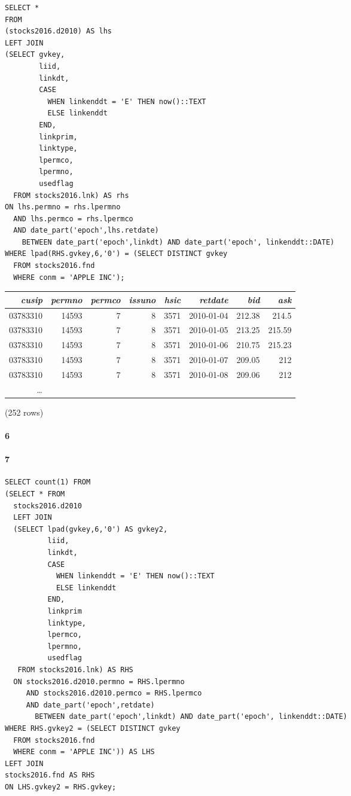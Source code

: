 \documentclass[]{article}
\let\oldparagraph\paragraph
\renewcommand{\paragraph}[1]{\oldparagraph{#1}\mbox{}}
\begin{document}
\color{blue}
\begin{verbatim}
SELECT *
FROM 
(stocks2016.d2010) AS lhs
LEFT JOIN
(SELECT gvkey,
        liid,
        linkdt,
        CASE
          WHEN linkenddt = 'E' THEN now()::TEXT
          ELSE linkenddt
        END,
        linkprim,
        linktype,
        lpermco,
        lpermno,
        usedflag
  FROM stocks2016.lnk) AS rhs
ON lhs.permno = rhs.lpermno
  AND lhs.permco = rhs.lpermco
  AND date_part('epoch',lhs.retdate) 
    BETWEEN date_part('epoch',linkdt) AND date_part('epoch', linkenddt::DATE)
WHERE lpad(RHS.gvkey,6,'0') = (SELECT DISTINCT gvkey
  FROM stocks2016.fnd
  WHERE conm = 'APPLE INC');
\end{verbatim}
\color{black}

\begin{center}
\begin{tabular}{r | r | r | r | r | r | r | r }
\textit{cusip} & \textit{permno} & \textit{permco} & \textit{issuno} & \textit{hsic} & \textit{retdate} & \textit{bid} & \textit{ask} \\
\hline
03783310 & 14593 & 7 & 8 & 3571 & 2010-01-04 & 212.38 & 214.5\\
03783310 & 14593 & 7 & 8 & 3571 & 2010-01-05 & 213.25 & 215.59\\
03783310 & 14593 & 7 & 8 & 3571 & 2010-01-06 & 210.75 & 215.23 \\
03783310 & 14593 & 7 & 8 & 3571 & 2010-01-07 & 209.05 & 212 \\
03783310 & 14593 & 7 & 8 & 3571 & 2010-01-08 & 209.06 & 212 \\
\ldots \\
\end{tabular}

\noindent (252 rows) \\
\end{center}

\paragraph{6}



\paragraph{7}

\color{blue}
\begin{verbatim}
SELECT count(1) FROM
(SELECT * FROM
  stocks2016.d2010
  LEFT JOIN
  (SELECT lpad(gvkey,6,'0') AS gvkey2,
          liid,
          linkdt,
          CASE
            WHEN linkenddt = 'E' THEN now()::TEXT
            ELSE linkenddt
          END,
          linkprim
          linktype,
          lpermco,
          lpermno,
          usedflag
   FROM stocks2016.lnk) AS RHS
  ON stocks2016.d2010.permno = RHS.lpermno
     AND stocks2016.d2010.permco = RHS.lpermco
     AND date_part('epoch',retdate)
       BETWEEN date_part('epoch',linkdt) AND date_part('epoch', linkenddt::DATE)
WHERE RHS.gvkey2 = (SELECT DISTINCT gvkey
  FROM stocks2016.fnd
  WHERE conm = 'APPLE INC')) AS LHS
LEFT JOIN
stocks2016.fnd AS RHS
ON LHS.gvkey2 = RHS.gvkey;
\end{verbatim}
\color{black}
\end{document}
